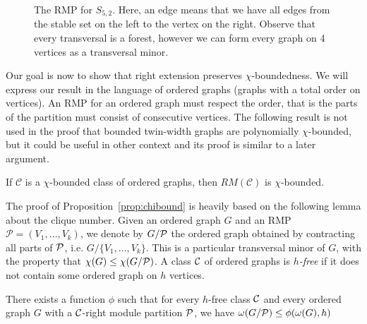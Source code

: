 \documentclass[11pt]{article}
\numberwithin{equation}{section}
\newcommand{\pcb}{polynomially $\chi$-bounded}
\begin{document}
\begin{figure}[h]
\centering
{}
\caption{The RMP for $S_{5, 2}$. Here, an edge means that we have all edges from the stable set on the left to the vertex on the right. Observe that every transversal is a forest, however we can form every graph on 4 vertices as a transversal minor.}
\end{figure}


Our goal is now to show that right extension preserves $\chi$-boundedness. We will express our result in the language of ordered graphs (graphs with a total order on vertices). An RMP for an ordered graph must respect the order, that is the parts of the partition must consist of consecutive vertices. The following result is not used in the proof that bounded twin-width graphs are \pcb, but it could be useful in other context and its proof is similar to a later argument.  

\begin{proposition}\label{prop:chibound} If $\mathcal{C}$ is a  $\chi$-bounded class of ordered graphs, then $RM(\mathcal{C})$ is $\chi$-bounded.
\end{proposition}

The proof of Proposition~\ref{prop:chibound} is heavily based on the following lemma about the clique number. Given an ordered graph $G$ and an RMP ${\mathcal P}=(V_1, \ldots, V_k)$, we denote by $G/\cal P$ the ordered graph obtained by contracting all parts of $\cal P$, i.e. $G / \{V_1, \ldots, V_k\}$. This is a particular transversal minor of $G$, with the property that $\chi (G) \leq \chi (G/{\cal P})$. 
A class $\cal C$ of ordered graphs is \emph{$h$-free} if it does not contain some ordered graph on $h$ vertices.

\begin{lemma} There exists a function $\phi$ such that for every $h$-free class $\cal C$ and every ordered graph $G$ with a $\cal C$-right module partition $\cal P$, we have $\omega (G/{\cal P})\leq \phi (\omega (G),h)$
\end{lemma}
\end{document}
